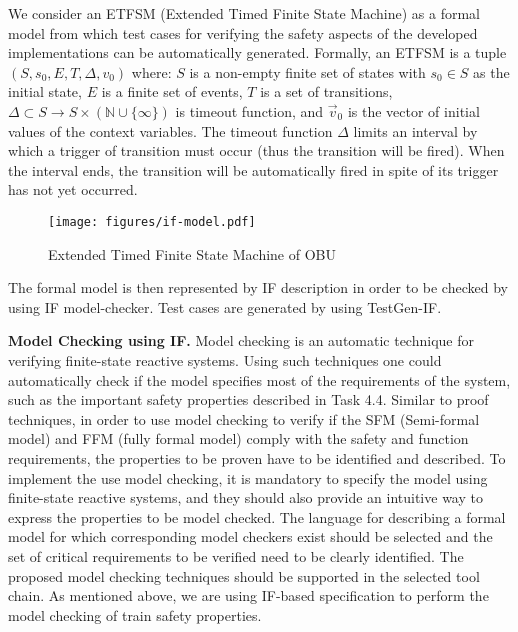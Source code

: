 \documentclass{template/openetcs_article}
\begin{document}
We consider an ETFSM (Extended Timed Finite State Machine) as a formal model
from which test cases for verifying the safety aspects of the developed
implementations can be automatically generated.
Formally, 
    an ETFSM is a tuple 
    $(S, s_0, E, T,  \Delta, v_0)$ where:
    $S$ is a non-empty finite set of states with $s_0 \in S$ as the
        initial state,
 $E$ is a finite set of events,
 $T$ is a set of transitions, 
 $\Delta \subset S \to S \times (\mathbb{N} \cup \{ \infty \})$ is timeout function, and
 $\vec{v}_0$ is the vector of initial values of the context variables.
The timeout function $\Delta$ limits an interval by which a trigger of
transition must occur (thus the transition will be fired). 
When the interval ends, the transition will be automatically fired in spite of
its trigger has not yet occurred.


\begin{figure}[!htbp]
\begin{center}
  \texttt{[image: figures/if-model.pdf]}
  \caption{Extended Timed Finite State Machine of OBU}
  \label{fig:model}
\end{center}
\end{figure}



The formal model is then represented by IF description%
in order to be checked by using IF model-checker.
Test cases are generated by using TestGen-IF.

\textbf{Model Checking using IF.}
Model checking is an automatic technique for verifying finite-state reactive
systems. Using such techniques one could automatically check if the model
specifies most of the requirements of the system, such as the important safety
properties described in Task 4.4. Similar to proof techniques, in order to use
model checking to verify if the SFM (Semi-formal model) and FFM (fully formal
model) comply with the safety and function requirements,
the properties to be proven have to be identified and described. To implement
the use model checking, it is mandatory to specify the model using finite-state
reactive systems, and they should also provide an intuitive way to express the
properties to be model checked. The language for describing a formal model for
which corresponding model checkers exist should be selected and the set of
critical requirements to be verified need to be clearly identified. The proposed
model checking techniques should be supported in the selected tool chain. As
mentioned above, we are using IF-based specification to perform
the model checking of train safety properties.
\end{document}
